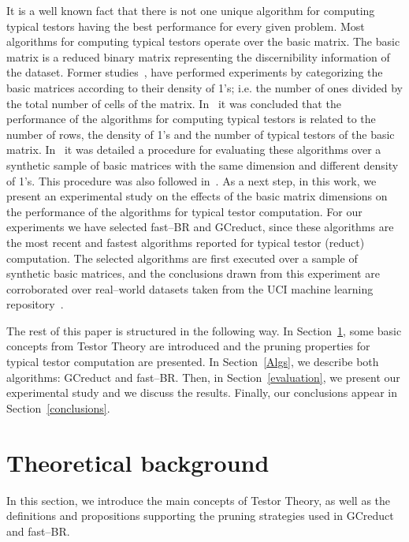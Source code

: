 \documentclass[citenumber]{llncs}
\begin{document}
	
	It is a well known fact that there is not one unique algorithm for computing typical testors having the best performance for every given problem. Most algorithms for computing typical testors operate over the basic matrix. The basic matrix is a reduced binary matrix representing the discernibility information of the dataset. Former studies~\cite{Lias13,Rodriguez15}, have performed experiments by categorizing the  basic matrices according to their density of 1's; i.e. the number of ones divided by the total number of cells of the matrix. In~\cite{Gonzalez15} it was concluded that  the performance of the algorithms for computing typical testors is related to the number of rows, the density of 1's and the number of typical testors of the basic matrix. In~\cite{Rodriguez2017} it was detailed a procedure for evaluating these algorithms over a synthetic sample of basic matrices with the same dimension and different density of 1's. This procedure was also followed in~\cite{Rodriguez2018}. As a next step, in this work, we present an experimental study on the effects of the basic matrix dimensions on the performance of the algorithms for typical testor computation. For our experiments we have selected fast--BR and GCreduct, since these algorithms are the most recent and fastest algorithms reported for typical testor (reduct) computation. The selected algorithms are first executed over a sample of synthetic basic matrices, and the conclusions drawn from this experiment are corroborated over real--world datasets taken from the UCI machine learning repository~\cite{Bache13}. 	
	
	
	The rest of this paper is structured in the following way. In Section~\ref{tb}, some basic concepts from Testor Theory are introduced and the pruning properties for typical testor computation are presented. In Section~\ref{Algs}, we describe both algorithms: GCreduct and fast--BR. Then, in Section~\ref{evaluation}, we present our experimental study and we discuss the results. Finally, our conclusions appear in Section~\ref{conclusions}.
	
	

					
%
\section{Theoretical background} \label{tb}
%

In this section, we introduce the main concepts of Testor Theory, as well as the definitions and propositions supporting the pruning strategies used in GCreduct and fast--BR. 
\end{document}
